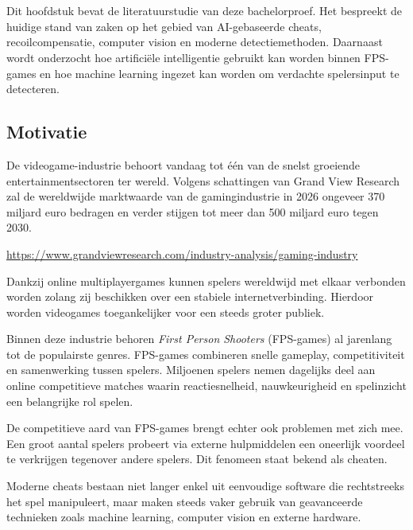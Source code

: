 \chapter{}
\label{ch:stand-van-zaken}

Dit hoofdstuk bevat de literatuurstudie van deze bachelorproef. Het bespreekt de huidige stand van zaken op het gebied van AI-gebaseerde cheats, recoilcompensatie, computer vision en moderne detectiemethoden. Daarnaast wordt onderzocht hoe artificiële intelligentie gebruikt kan worden binnen FPS-games en hoe machine learning ingezet kan worden om verdachte spelersinput te detecteren.

\section{Motivatie}

De videogame-industrie behoort vandaag tot één van de snelst groeiende entertainmentsectoren ter wereld. Volgens schattingen van Grand View Research zal de wereldwijde marktwaarde van de gamingindustrie in 2026 ongeveer 370 miljard euro bedragen en verder stijgen tot meer dan 500 miljard euro tegen 2030.

\url{https://www.grandviewresearch.com/industry-analysis/gaming-industry}

Dankzij online multiplayergames kunnen spelers wereldwijd met elkaar verbonden worden zolang zij beschikken over een stabiele internetverbinding. Hierdoor worden videogames toegankelijker voor een steeds groter publiek.

Binnen deze industrie behoren \textit{First Person Shooters} (FPS-games) al jarenlang tot de populairste genres. FPS-games combineren snelle gameplay, competitiviteit en samenwerking tussen spelers. Miljoenen spelers nemen dagelijks deel aan online competitieve matches waarin reactiesnelheid, nauwkeurigheid en spelinzicht een belangrijke rol spelen.

De competitieve aard van FPS-games brengt echter ook problemen met zich mee. Een groot aantal spelers probeert via externe hulpmiddelen een oneerlijk voordeel te verkrijgen tegenover andere spelers. Dit fenomeen staat bekend als cheaten.

Moderne cheats bestaan niet langer enkel uit eenvoudige software die rechtstreeks het spel manipuleert, maar maken steeds vaker gebruik van geavanceerde technieken zoals machine learning, computer vision en externe hardware.

